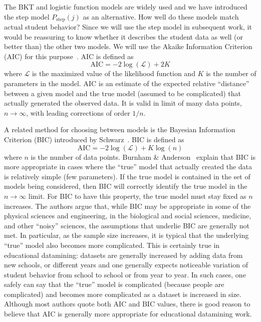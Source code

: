 \documentclass{edm_template}
\begin{document}
The BKT and logistic function models are widely used and
we have introduced the step model $P_\mathrm{step}(j)$
as an alternative.  How
well do these models match actual student behavior?
Since we will use the step model in subsequent
work, it would be reassuring to know whether it describes the student data as 
well (or better than) the other two models.  We will use the Akaike Information Criterion (AIC) for this purpose~\cite{akaike_new_1974,burnham_model_2002}.
AIC is defined as
%
\begin{equation}
   \mathrm{AIC}= -2 \log\left(\mathcal{L}\right) + 2K
\end{equation}
% 
where $\mathcal{L}$ is the maximized value of the likelihood function
and $K$ is the number of parameters in the model.
 AIC is an estimate of the expected relative ``distance''
between a given model and the true model (assumed to be complicated) 
that actually generated the observed data.  It is valid in limit of 
many data points, $n\to\infty$, with leading corrections of order $1/n$.

A related method for choosing between models is the Bayesian
Information Criterion (BIC) introduced by
Schwarz~\citeyear{schwarz_estimating_1978}.  BIC is defined as
%
\begin{equation}
   \mathrm{AIC}= -2 \log\left(\mathcal{L}\right) + K \log\left(n\right)
\end{equation}
% 
where $n$ is the number of data points.
Burnham \& Anderson~\citeyear[Sections~6.3 \& 6.4]{burnham_model_2002} explain
that BIC is more appropriate in cases where the ``true'' model that
actually created the data is relatively simple (few parameters).  If
the true model is contained in the set of models being considered,
then BIC will correctly identify the true model in the $n\to\infty$
limit.  For BIC to have this property, the true model must stay fixed as 
$n$ increases.  
The authors argue that, while BIC may be appropriate in some
of the physical sciences and engineering, in the biological and social
sciences, medicine, and other ``noisy'' sciences, the assumptions that
underlie BIC are generally not met.  In particular, as the sample size
increases, it is typical that the underlying ``true'' model also
becomes more complicated.  This is certainly true in educational
datamining: datasets are generally increased by adding data from new schools, or
different years and one generally expects noticeable variation of student
behavior from school to school or from year to year.  In such cases, one
safely can say that the ``true'' model is complicated (because people are
complicated) and becomes more complicated as a dataset is increased in
size.  Although most authors quote both AIC and BIC values, there
is good reason to believe that AIC is generally more appropriate for
educational datamining work.
\end{document}
